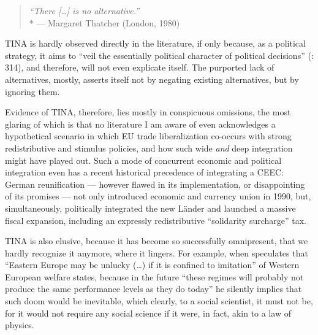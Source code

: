 \begin{quote}
	\emph{``There [\ldots] is no alternative.''}\\*
	--- Margaret Thatcher (London, 1980)
\end{quote}

TINA is hardly observed directly in the literature, if only because, as a political strategy, it aims to ``veil the essentially political character of political decisions'' (\citealt{Bluhdorn-2007-aa}: 314), and therefore, will not even explicate itself. The purported lack of alternatives, mostly, asserts itself not by negating existing alternatives, but by ignoring them.

Evidence of TINA, therefore, lies mostly in conspicuous omissions, the most glaring of which is that no literature I am aware of even acknowledges a hypothetical scenario in which \gls{EU} trade liberalization co-occurs with strong redistributive and stimulus policies, and how such wide \emph{and} deep integration might have played out.   Such a mode of concurrent economic and political integration even has a recent historical precedence of integrating a \gls{CEEC}: German reunification --- however flawed in its implementation, or disappointing of its promises --- not only introduced economic and currency union in 1990, but, simultaneously, politically integrated the new Länder and launched a massive fiscal expansion, including an expressly redistributive ``solidarity surcharge'' tax.

TINA is also elusive, because it has become so successfully omnipresent, that we hardly recognize it anymore, where it lingers. For example, when \citeauthor{Kovasc} speculates that ``Eastern Europe may be unlucky (\ldots) if it is confined to imitation'' of Western European welfare states, because in the future ``these regimes will probably not produce the same performance levels as they do today'' he silently implies that such doom would be inevitable, which clearly, to a social scientist, it must not be, for it would not require any social science if it were, in fact, akin to a law of physics.

